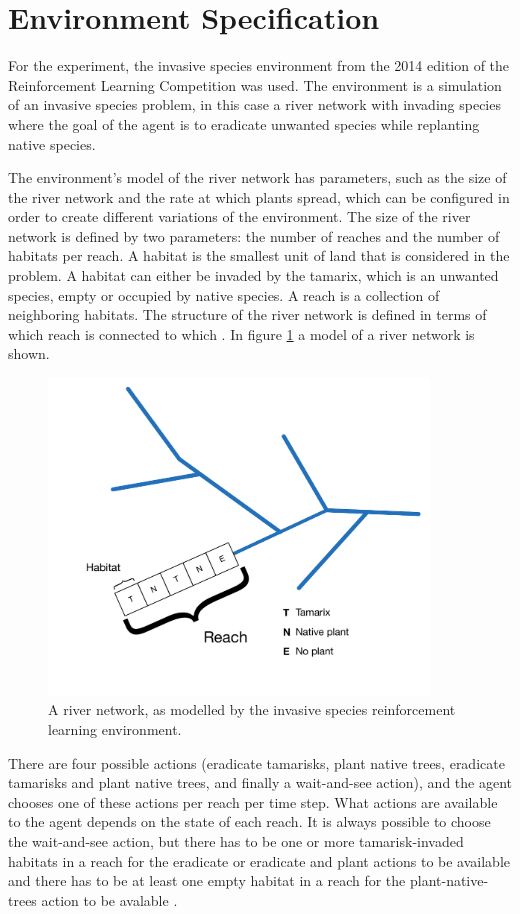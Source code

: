 \section{Environment Specification}
\label{sec:experiment_env}

For the experiment, the invasive species environment from the 2014 edition of
the Reinforcement Learning Competition was used. The environment is a
simulation of an invasive species problem, in this case a river network with
invading species where the goal of the agent is to eradicate unwanted species
while replanting native species. 

The environment's model of the river network has parameters, such as the size
of the river network and the rate at which plants spread, which can be
configured in order to create different variations of the environment.  The
size of the river network is defined by two parameters: the number of reaches
and the number of habitats per reach. A habitat is the smallest unit of land
that is considered in the problem. A habitat can either be invaded by the
tamarix, which is an unwanted species, empty or occupied by native species. A
reach is a collection of neighboring habitats. The structure of the river
network is defined in terms of which reach is connected to which
\parencite{invasiveSpecis2014:Online}. In figure \ref{fig:river} a model of a
river network is shown.

\begin{figure}[ht]
\centering
\includegraphics[width=0.9\textwidth]{images/river_network.pdf}
\caption{A river network, as modelled by the invasive species reinforcement learning environment.}
\label{fig:river}
\end{figure}

There are four possible actions (eradicate tamarisks, plant native trees,
eradicate tamarisks and plant native trees, and finally a wait-and-see action),
and the agent chooses one of these actions per reach per time step. What
actions are available to the agent depends on the state of each reach. It is
always possible to choose the wait-and-see action, but there has to be one
or more tamarisk-invaded habitats in a reach for the eradicate or eradicate and
plant actions to be available and there has to be at least one empty habitat in
a reach for the plant-native-trees action to be avalable
\parencite{invasiveSpecis2014:Online}. 

